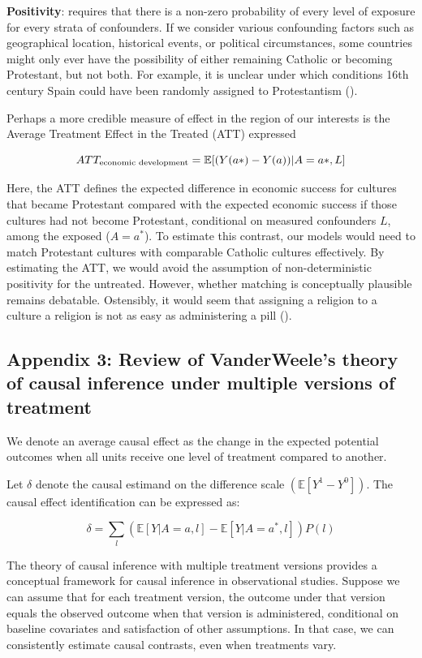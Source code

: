 \documentclass[
  singlecolumn,
  9pt]{article}
\begin{document}
\textbf{Positivity}: requires that there is a non-zero probability of
every level of exposure for every strata of confounders. If we consider
various confounding factors such as geographical location, historical
events, or political circumstances, some countries might only ever have
the possibility of either remaining Catholic or becoming Protestant, but
not both. For example, it is unclear under which conditions 16th century
Spain could have been randomly assigned to Protestantism
().

Perhaps a more credible measure of effect in the region of our interests
is the Average Treatment Effect in the Treated (ATT) expressed

\[ATT_{\textnormal{economic~development}} = \mathbb{E}[(Y(a*)- Y(a))|A = a*,L]\]

Here, the ATT defines the expected difference in economic success for
cultures that became Protestant compared with the expected economic
success if those cultures had not become Protestant, conditional on
measured confounders \(L\), among the exposed (\(A = a^*\)). To estimate
this contrast, our models would need to match Protestant cultures with
comparable Catholic cultures effectively. By estimating the ATT, we
would avoid the assumption of non-deterministic positivity for the
untreated. However, whether matching is conceptually plausible remains
debatable. Ostensibly, it would seem that assigning a religion to a
culture a religion is not as easy as administering a pill
().

\subsection{Appendix 3: Review of VanderWeele's theory of causal
inference under multiple versions of
treatment}\label{appendix-3-review-of-vanderweeles-theory-of-causal-inference-under-multiple-versions-of-treatment}

We denote an average causal effect as the change in the expected
potential outcomes when all units receive one level of treatment
compared to another.

Let \(\delta\) denote the causal estimand on the difference scale
\((\mathbb{E}[Y^1 - Y^0])\). The causal effect identification can be
expressed as:

\[ \delta = \sum_l \left( \mathbb{E}[Y|A=a,l] - \mathbb{E}[Y|A=a^*,l] \right) P(l)\]

The theory of causal inference with multiple treatment versions provides
a conceptual framework for causal inference in observational studies.
Suppose we can assume that for each treatment version, the outcome under
that version equals the observed outcome when that version is
administered, conditional on baseline covariates and satisfaction of
other assumptions. In that case, we can consistently estimate causal
contrasts, even when treatments vary.
\end{document}
